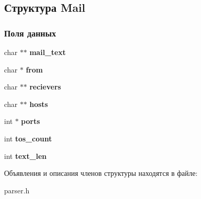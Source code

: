 \hypertarget{structMail}{}\subsection{Структура Mail}
\label{structMail}
\subsubsection*{Поля данных}
\begin{DoxyCompactItemize}
\item 
char $\ast$$\ast$ {\bfseries mail\+\_\+text}\hypertarget{structMail_a1845bc27c03b2aba88a08d13026c05da}{}\label{structMail_a1845bc27c03b2aba88a08d13026c05da}

\item 
char $\ast$ {\bfseries from}\hypertarget{structMail_a8ae94c44a7d3cdee8f7c7baaf7bcd719}{}\label{structMail_a8ae94c44a7d3cdee8f7c7baaf7bcd719}

\item 
char $\ast$$\ast$ {\bfseries recievers}\hypertarget{structMail_a06689cd3f8a0dc605e8407f9f7486b72}{}\label{structMail_a06689cd3f8a0dc605e8407f9f7486b72}

\item 
char $\ast$$\ast$ {\bfseries hosts}\hypertarget{structMail_a0d2f28cd0527e45d54ae0f0b41308b55}{}\label{structMail_a0d2f28cd0527e45d54ae0f0b41308b55}

\item 
int $\ast$ {\bfseries ports}\hypertarget{structMail_abc5a2843f76ead56ad0eae15136ca7fa}{}\label{structMail_abc5a2843f76ead56ad0eae15136ca7fa}

\item 
int {\bfseries tos\+\_\+count}\hypertarget{structMail_aea834206b3f0c6a1d027dac569f9eea5}{}\label{structMail_aea834206b3f0c6a1d027dac569f9eea5}

\item 
int {\bfseries text\+\_\+len}\hypertarget{structMail_a1302559266b7b64b1b4ca38c584ed0d9}{}\label{structMail_a1302559266b7b64b1b4ca38c584ed0d9}

\end{DoxyCompactItemize}


Объявления и описания членов структуры находятся в файле\+:\begin{DoxyCompactItemize}
\item 
parser.\+h\end{DoxyCompactItemize}
